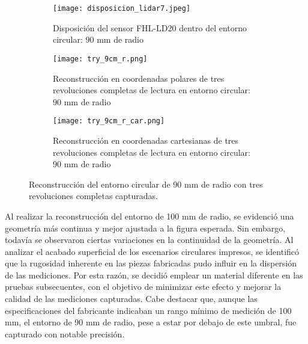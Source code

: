 \begin{figure}[H]
	\centering
	\begin{subfigure}{0.6\textwidth}
		\centering
		\texttt{[image: disposicion\_lidar7.jpeg]}
		\caption{Disposición del sensor FHL-LD20 dentro del entorno circular: 90 mm de radio}
		\vspace{1em}
	\end{subfigure}
	\begin{subfigure}{0.45\textwidth}
		\centering
		\texttt{[image: try\_9cm\_r.png]}
		\caption{Reconstrucción en coordenadas polares de tres revoluciones completas de lectura en entorno circular: 90 mm de radio}
		\label{try_9cm_r}
	\end{subfigure}
	\hspace{1em}
	\begin{subfigure}{0.45\textwidth}
		\centering
		\texttt{[image: try\_9cm\_r\_car.png]}
		\caption{Reconstrucción en coordenadas cartesianas de tres revoluciones completas de lectura en entorno circular: 90 mm de radio}
		\label{try_9cm_r_car}
	\end{subfigure}
	\caption{Reconstrucción del entorno circular de 90 mm de radio con tres revoluciones completas capturadas.}
	\label{fig: reconstrucciones_vacías_9}
\end{figure}

 
Al realizar la reconstrucción del entorno de 100 mm de radio, se evidenció una geometría más continua y mejor ajustada a la figura esperada. Sin embargo, todavía se observaron ciertas variaciones en la continuidad de la geometría. Al analizar el acabado superficial de los escenarios circulares impresos, se identificó que la rugosidad inherente en las piezas fabricadas pudo influir en la dispersión de las mediciones. Por esta razón, se decidió emplear un material diferente en las pruebas subsecuentes, con el objetivo de minimizar este efecto y mejorar la calidad de las mediciones capturadas. Cabe destacar que, aunque las especificaciones del fabricante indicaban un rango mínimo de medición de 100 mm, el entorno de 90 mm de radio, pese a estar por debajo de este umbral, fue capturado con notable precisión.

